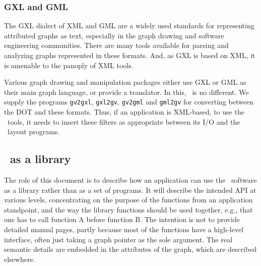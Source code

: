 \subsubsection{GXL and GML}
The GXL \cite{gxl} dialect of XML and GML \cite{gml} are a widely used standards for
representing attributed graphs as text, especially in the graph
drawing and software engineering communities. There
are many tools available for parsing and analyzing graphs represented
in these formats. And, as GXL is based on XML, it is amenable to the panoply of
XML tools.

Various graph drawing and manipulation packages either 
use GXL or GML as their main graph language, or provide a translator.  
In this, \gviz\ is no different. We supply the programs
{\tt gv2gxl}, {\tt gxl2gv}, {\tt gv2gml} and {\tt gml2gv} 
for converting between the DOT and
these formats. Thus, if an application is XML-based, to use the
\gviz\ tools, it needs to insert these filters as appropriate between
its I/O and the \gviz\ layout programs.  

\subsection{\gviz\ as a library}
The role of this document is to describe how an application can use the
\gviz\ software as a library rather than as a set of programs. It will
describe the intended API at various levels, concentrating on the purpose
of the functions from an application standpoint, and the way the 
library functions should be used together, e.g., that one has to call
function A before function B. The intention is not to provide
detailed manual pages, partly because most of the functions have a high-level 
interface, often just taking a graph pointer as the sole argument.
The real semantic details are embedded in the
attributes of the graph, which are described elsewhere. 

